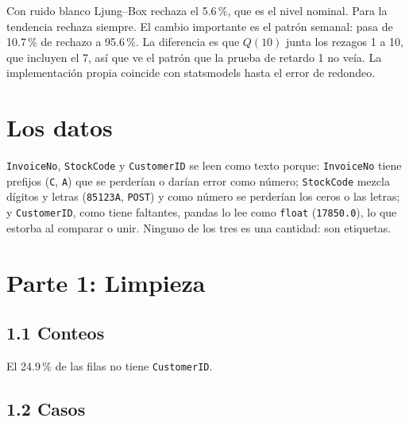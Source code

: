 \documentclass[11pt]{article}
\newcommand{\tabla}[1]{}
\begin{document}
Con ruido blanco Ljung--Box rechaza el 5.6\,\%, que es el nivel nominal. Para la tendencia rechaza siempre. El cambio importante es el patrón semanal: pasa de 10.7\,\% de rechazo a 95.6\,\%. La diferencia es que $Q(10)$ junta los rezagos 1 a 10, que incluyen el 7, así que ve el patrón que la prueba de retardo 1 no veía. La implementación propia coincide con statsmodels hasta el error de redondeo.

\section{Los datos}
\texttt{InvoiceNo}, \texttt{StockCode} y \texttt{CustomerID} se leen como texto porque: \texttt{InvoiceNo} tiene prefijos (\texttt{C}, \texttt{A}) que se perderían o darían error como número; \texttt{StockCode} mezcla dígitos y letras (\texttt{85123A}, \texttt{POST}) y como número se perderían los ceros o las letras; y \texttt{CustomerID}, como tiene faltantes, pandas lo lee como \texttt{float} (\texttt{17850.0}), lo que estorba al comparar o unir. Ninguno de los tres es una cantidad: son etiquetas.

\section{Parte 1: Limpieza}

\subsection*{1.1 Conteos}
\begin{table}[H]\centering\small
\caption{Conteos del archivo original.}
\tabla{p1_conteos}
\end{table}
El 24.9\,\% de las filas no tiene \texttt{CustomerID}.

\subsection*{1.2 Casos}
\begin{table}[H]\centering\small
\caption{Filas y monto ($Q\times P$) de cada caso, medidos por separado sobre los datos crudos.}
\tabla{p1_casos}
\end{table}
\end{document}
